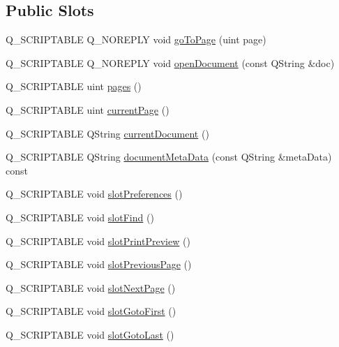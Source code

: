 \subsection*{Public Slots}
\begin{DoxyCompactItemize}
\item 
Q\+\_\+\+S\+C\+R\+I\+P\+T\+A\+B\+L\+E Q\+\_\+\+N\+O\+R\+E\+P\+L\+Y void \hyperlink{classOkular_1_1Part_a8524593b5646c6f633c921014c9a1b5f}{go\+To\+Page} (uint page)
\item 
Q\+\_\+\+S\+C\+R\+I\+P\+T\+A\+B\+L\+E Q\+\_\+\+N\+O\+R\+E\+P\+L\+Y void \hyperlink{classOkular_1_1Part_afdd1f330544fe8edf6427a6e9b1b5ef0}{open\+Document} (const Q\+String \&doc)
\item 
Q\+\_\+\+S\+C\+R\+I\+P\+T\+A\+B\+L\+E uint \hyperlink{classOkular_1_1Part_a91ab48c6ac9ee0edb1eac524e141e54b}{pages} ()
\item 
Q\+\_\+\+S\+C\+R\+I\+P\+T\+A\+B\+L\+E uint \hyperlink{classOkular_1_1Part_ac8275b0585ad5cec819ca54ef1f29811}{current\+Page} ()
\item 
Q\+\_\+\+S\+C\+R\+I\+P\+T\+A\+B\+L\+E Q\+String \hyperlink{classOkular_1_1Part_a809746d75f604de4f9be353d57efc6ec}{current\+Document} ()
\item 
Q\+\_\+\+S\+C\+R\+I\+P\+T\+A\+B\+L\+E Q\+String \hyperlink{classOkular_1_1Part_a7d9d2de77cb4fe32a75db7ab3eb7d958}{document\+Meta\+Data} (const Q\+String \&meta\+Data) const 
\item 
Q\+\_\+\+S\+C\+R\+I\+P\+T\+A\+B\+L\+E void \hyperlink{classOkular_1_1Part_ade86c00f5d1862447c4b6fb506a6789a}{slot\+Preferences} ()
\item 
Q\+\_\+\+S\+C\+R\+I\+P\+T\+A\+B\+L\+E void \hyperlink{classOkular_1_1Part_af99fda5f9bade72bfc20fd8165974da5}{slot\+Find} ()
\item 
Q\+\_\+\+S\+C\+R\+I\+P\+T\+A\+B\+L\+E void \hyperlink{classOkular_1_1Part_a03b8c9ee5bb4114334aad54747fcb17f}{slot\+Print\+Preview} ()
\item 
Q\+\_\+\+S\+C\+R\+I\+P\+T\+A\+B\+L\+E void \hyperlink{classOkular_1_1Part_a30e41c7a6cc7392a580f7feaa5873a6e}{slot\+Previous\+Page} ()
\item 
Q\+\_\+\+S\+C\+R\+I\+P\+T\+A\+B\+L\+E void \hyperlink{classOkular_1_1Part_a2f6b5d102a9e13856975ee047fc8e508}{slot\+Next\+Page} ()
\item 
Q\+\_\+\+S\+C\+R\+I\+P\+T\+A\+B\+L\+E void \hyperlink{classOkular_1_1Part_a026d18dc186aac4dbc3373662472c1db}{slot\+Goto\+First} ()
\item 
Q\+\_\+\+S\+C\+R\+I\+P\+T\+A\+B\+L\+E void \hyperlink{classOkular_1_1Part_aaeb02c46cf80ad9b2bc4a6a88342c071}{slot\+Goto\+Last} ()

\end{DoxyCompactItemize}
